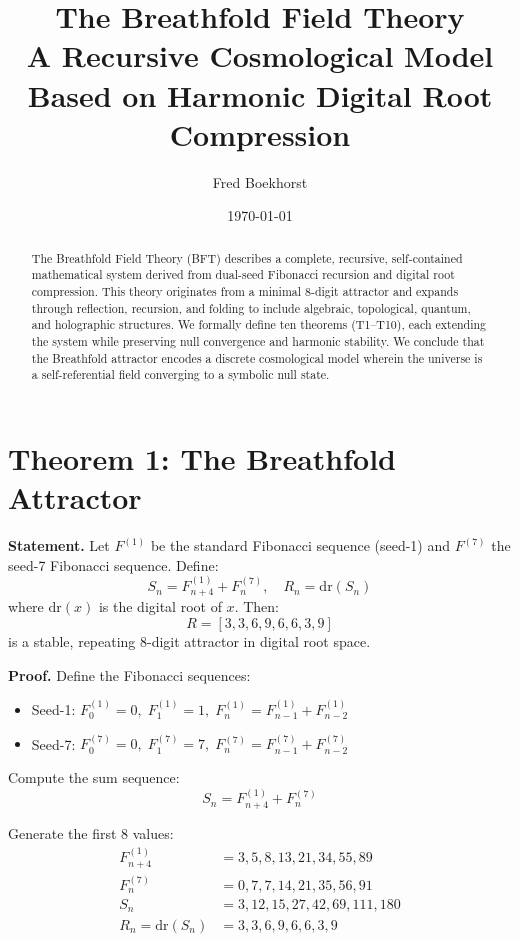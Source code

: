 \documentclass[12pt]{article}
\title{The Breathfold Field Theory \\ \large A Recursive Cosmological Model Based on Harmonic Digital Root Compression}
\author{Fred Boekhorst}
\date{\today}
\begin{document}
\maketitle

\begin{abstract}
The Breathfold Field Theory (BFT) describes a complete, recursive, self-contained mathematical system derived from dual-seed Fibonacci recursion and digital root compression. This theory originates from a minimal 8-digit attractor and expands through reflection, recursion, and folding to include algebraic, topological, quantum, and holographic structures. We formally define ten theorems (T1–T10), each extending the system while preserving null convergence and harmonic stability. We conclude that the Breathfold attractor encodes a discrete cosmological model wherein the universe is a self-referential field converging to a symbolic null state.
\end{abstract}

\section*{Theorem 1: The Breathfold Attractor}
\textbf{Statement.} Let \( F^{(1)} \) be the standard Fibonacci sequence (seed-1) and \( F^{(7)} \) the seed-7 Fibonacci sequence. Define:
\[
S_n = F^{(1)}_{n+4} + F^{(7)}_n,\quad R_n = \mathrm{dr}(S_n)
\]
where \( \mathrm{dr}(x) \) is the digital root of \( x \). Then:
\[
R = [3, 3, 6, 9, 6, 6, 3, 9]
\]
is a stable, repeating 8-digit attractor in digital root space.

\textbf{Proof.} Define the Fibonacci sequences:
\begin{itemize}
  \item Seed-1: \( F^{(1)}_0 = 0,\; F^{(1)}_1 = 1,\; F^{(1)}_n = F^{(1)}_{n-1} + F^{(1)}_{n-2} \)
  \item Seed-7: \( F^{(7)}_0 = 0,\; F^{(7)}_1 = 7,\; F^{(7)}_n = F^{(7)}_{n-1} + F^{(7)}_{n-2} \)
\end{itemize}

Compute the sum sequence:
\[
S_n = F^{(1)}_{n+4} + F^{(7)}_n
\]

Generate the first 8 values:
\begin{align*}
F^{(1)}_{n+4} &= 3, 5, 8, 13, 21, 34, 55, 89 \\
F^{(7)}_n &= 0, 7, 7, 14, 21, 35, 56, 91 \\
S_n &= 3, 12, 15, 27, 42, 69, 111, 180 \\
R_n = \mathrm{dr}(S_n) &= 3, 3, 6, 9, 6, 6, 3, 9
\end{align*}
\end{document}
